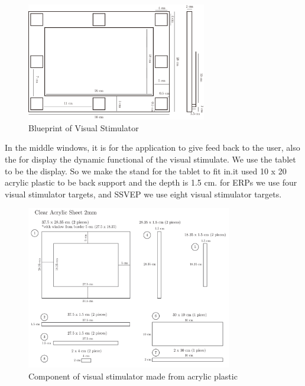 \begin{figure}[ht]
	\centering
	\includegraphics[width=0.7\textwidth]{chapter6/blueprint.pdf}
	\caption{Blueprint of Visual Stimulator}
\end{figure}
In the middle windows, it is for the application to give feed back to the user, also the for display the dynamic functional of the visual stimulate. We use the tablet to be the display. So we make the stand for the tablet to fit in.it used 10 x 20 acrylic plastic to be back support and the depth is 1.5 cm. for ERPs we use four visual stimulator targets, and SSVEP we use eight visual stimulator targets. 



\begin{figure}[ht]
	\centering
	\includegraphics[width=0.8\textwidth]{chapter6/sch.pdf}
	\caption{Component of visual stimulator made from acrylic plastic}
	\label{fig:sch}
\end{figure}

